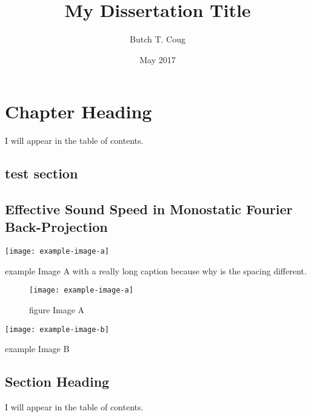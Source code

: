 \documentclass[
DToption=dissertation,%
]{wsu-dissertation-thesis}
\title{My Dissertation Title}
\author{Butch T. Coug}
\date{May 2017}
\begin{document}
\makeTitlePages

\makeSignaturePage

\begin{ackPage}
\lipsum[3]
\end{ackPage}

\begin{abstractPage}
\lipsum[4-5]
\end{abstractPage}

\tableofcontents\clearpage
\listoftables\clearpage
\listoffigures\clearpage
{}\clearpage


\chapter[Optional Chapter TOC Entry]{Chapter Heading}
I will appear in the table of contents.

\lipsum[1]

\section{test section}
\section{Effective Sound Speed in Monostatic Fourier Back-Projection}

\begin{example}
	\texttt{[image: example-image-a]}
	\caption{example Image A with a really long caption because why is the spacing different.}
\end{example}

\begin{figure}
	\texttt{[image: example-image-a]}
	\caption{figure Image A}
\end{figure}

\begin{example}
	\texttt{[image: example-image-b]}
	\caption{example Image B}
\end{example}


\section{Section Heading}
I will appear in the table of contents.
\end{document}
